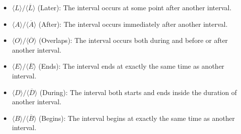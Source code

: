 \documentclass[11pt]{report}
\begin{document}
\begin{itemize}
\item $\langle L \rangle / \langle \overline{L} \rangle$ (Later): The interval occurs at some point after another interval.
\item $\langle A \rangle / \langle \overline{A} \rangle$ (After): The interval occurs immediately after another interval.
\item $\langle O \rangle / \langle \overline{O} \rangle$ (Overlaps): The interval occurs both during and before or after another interval.
\item $\langle E \rangle / \langle \overline{E} \rangle$ (Ends): The interval ends at exactly the same time as another interval.
\item $\langle D \rangle / \langle \overline{D} \rangle$ (During): The interval both starts and ends inside the duration of another interval.
\item $\langle B \rangle / \langle \overline{B} \rangle$ (Begins): The interval begins at exactly the same time as another interval.
\end{itemize}
\end{document}
